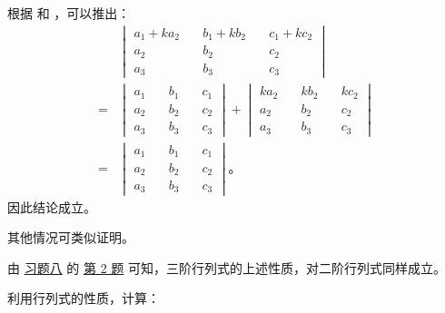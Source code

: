根据  和 ，可以推出：
\begin{align*}
      & \begin{vmatrix*}
            a_1 + ka_2 \quad & b_1 + kb_2 \quad & c_1 + kc_2 \\
            a_2 \quad & b_2 \quad & c_2 \\
            a_3 \quad & b_3 \quad & c_3
        \end{vmatrix*} \\
    ={} & \begin{vmatrix*}
            a_1 \quad & b_1 \quad & c_1 \\
            a_2 \quad & b_2 \quad & c_2 \\
            a_3 \quad & b_3 \quad & c_3
          \end{vmatrix*}
        + \begin{vmatrix*}
            ka_2 \quad & kb_2 \quad & kc_2 \\
            a_2 \quad & b_2 \quad & c_2 \\
            a_3 \quad & b_3 \quad & c_3
          \end{vmatrix*} \\
    ={} & \begin{vmatrix*}
            a_1 \quad & b_1 \quad & c_1 \\
            a_2 \quad & b_2 \quad & c_2 \\
            a_3 \quad & b_3 \quad & c_3
          \end{vmatrix*} \text{。}
\end{align*}
因此结论成立。

其他情况可类似证明。

由 \hyperref[xiti-8]{习题八} 的 \hyperref[xiti-8-2]{第 2 题} 可知，三阶行列式的上述性质，对二阶行列式同样成立。


\liti 利用行列式的性质，计算：


